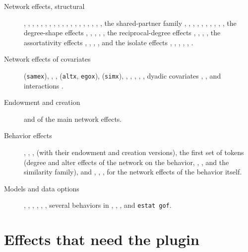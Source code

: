\begin{description}
\item[Network effects, structural] , , , , , , , , , , , , , , , , , , , the shared-partner family , , , , , , , , , , the degree-shape effects , , , , , the reciprocal-degree effects , , , , the assortativity effects , , , , and the isolate effects , , , , , .
\item[Network effects of covariates]  (\texttt{samex}), , ,  (\texttt{altx}, \texttt{egox}),  (\texttt{simx}), , , , , , dyadic covariates , , and interactions .
\item[Endowment and creation]  and  of the main network effects.
\item[Behavior effects] , , ,  (with their endowment and creation versions), the first set of  tokens (degree and alter effects of the network on the behavior, , ,  and the similarity family), and , , ,  for the network effects of the behavior itself.
\item[Models and data options] , , , , , , several behaviors in , , , and \texttt{estat gof}.
\end{description}

\section{Effects that need the plugin}

